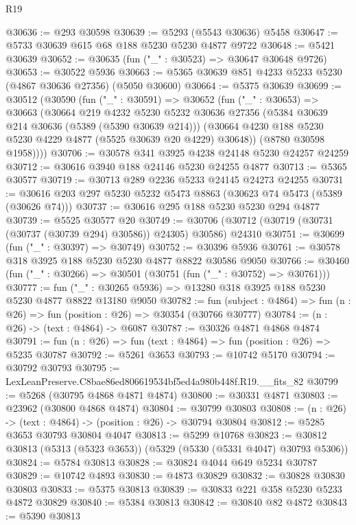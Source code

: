 \begin{lexlean}{R19}
\begin{coremodule}
@30636 := @293 @30598
@30639 := @5293 (@5543 @30636) @5458
@30647 := @5733 @30639 @615 @68 @188 @5230 @5230 @4877 @9722
@30648 := @5421 @30639
@30652 := @30635 (fun ("_" : @30523) => @30647 @30648 @9726)
@30653 := @30522 @5936
@30663 := @5365 @30639 @851 @4233 @5233 @5230 (@4867 @30636 @27356) (@5050 @30600)
@30664 := @5375 @30639
@30699 := @30512
    (@30590
      (fun ("_" : @30591) =>
      @30652
        (fun ("_" : @30653) =>
        @30663
          (@30664
            @219
            @4232
            @5230
            @5232
            @30636
            @27356
            (@5384 @30639 @214 @30636 (@5389 (@5390 @30639 @214)))
            (@30664 @4230 @188 @5230 @5230 @4229 @4877 (@5525 @30639 @20 @4229) @30648))
          (@8780 @30598 @1958))))
@30706 := @30578 @341 @3925 @4238 @24148 @5230 @24257 @24259
@30712 := @30616 @3940 @188 @24146 @5230 @24255 @4877
@30713 := @5365 @30577
@30719 := @30713 @289 @2236 @5233 @24145 @24273 @24255
@30731 := @30616 @203 @297 @5230 @5232 @5473 @8863 (@30623 @74 @5473 (@5389 (@30626 @74)))
@30737 := @30616 @295 @188 @5230 @5230 @294 @4877
@30739 := @5525 @30577 @20
@30749 := @30706 (@30712 (@30719 (@30731 (@30737 (@30739 @294) @30586)) @24305) @30586) @24310
@30751 := @30699 (fun ("_" : @30397) => @30749)
@30752 := @30396 @5936
@30761 := @30578 @318 @3925 @188 @5230 @5230 @4877 @8822 @30586 @9050
@30766 := @30460 (fun ("_" : @30266) => @30501 (@30751 (fun ("_" : @30752) => @30761)))
@30777 := fun ("_" : @30265 @5936) => @13280 @318 @3925 @188 @5230 @5230 @4877 @8822 @13180 @9050
@30782 := fun (subject : @4864) => fun (n : @26) => fun (position : @26) => @30354 (@30766 @30777)
@30784 := (n : @26) -> (text : @4864) -> @6087
@30787 := @30326 @4871 @4868 @4874
@30791 := fun (n : @26) => fun (text : @4864) => fun (position : @26) => @5235 @30787
@30792 := @5261 @3653
@30793 := @10742 @5170
@30794 := @30792 @30793
@30795 := LexLeanPreserve.C8bae86ed806619534bf5ed4a980b448f.R19.__fits_82
@30799 := @5268 (@30795 @4868 @4871 @4874)
@30800 := @30331 @4871
@30803 := @23962 (@30800 @4868 @4874)
@30804 := @30799 @30803
@30808 := (n : @26) -> (text : @4864) -> (position : @26) -> @30794 @30804
@30812 := @5285 @3653 @30793 @30804 @4047
@30813 := @5299 @10768
@30823 := @30812 @30813 (@5313 (@5323 @3653)) (@5329 (@5330 (@5331 @4047) @30793 @5306))
@30824 := @5784 @30813
@30828 := @30824 @4044 @649 @5234 @30787
@30829 := @10742 @4893
@30830 := @4873 @30829
@30832 := @30828 @30830 @30803
@30833 := @5375 @30813
@30839 := @30833 @221 @358 @5230 @5233 @4872 @30829
@30840 := @5384 @30813
@30842 := @30840 @82 @4872
@30843 := @5390 @30813

\end{coremodule}
\end{lexlean}
